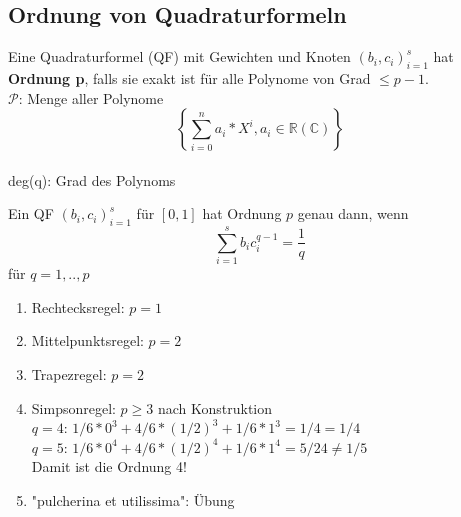 \subsection{Ordnung von Quadraturformeln}

\begin{definition}
Eine Quadraturformel (QF) mit Gewichten und Knoten $(b_i, c_i)_{i=1}^{s}$ hat \textbf{Ordnung p}, falls sie exakt ist für alle Polynome von Grad $ \leq p-1$.\\
$\mathcal{P}$: Menge aller Polynome $$\left\{ \sum_{i=0}^{n}a_i*X^i , a_i \in \mathbb{R} (\mathbb{C}) \right\}  $$ \\
deg(q): Grad des Polynoms
\end{definition}

\begin{theorem}
Ein QF $(b_i, c_i)_{i=1}^{s}$ für $[0,1]$ hat Ordnung $p$ genau dann, wenn
$$\sum_{i=1}^{s} b_i c_i^{q-1} = \frac{1}{q}$$ für $q = 1,..,p$
\end{theorem}

\begin{example}
\begin{description}
  \item
\end{description}

\begin{enumerate}
  \item Rechtecksregel: $p=1$
  \item Mittelpunktsregel: $p=2$
  \item Trapezregel: $p=2$
  \item Simpsonregel: $p \geq 3$ nach Konstruktion \\
  $q = 4$: $1/6 * 0^3 + 4/6 * (1/2)^3 + 1/6 * 1^3 = 1/4 = 1/4$ \\
  $q = 5$: $1/6 * 0^4 + 4/6 * (1/2)^4 + 1/6 * 1^4 = 5/24 \neq 1/5$ \\
  Damit ist die Ordnung 4!
  \item "pulcherina et utilissima": Übung
\end{enumerate}
\end{example}

